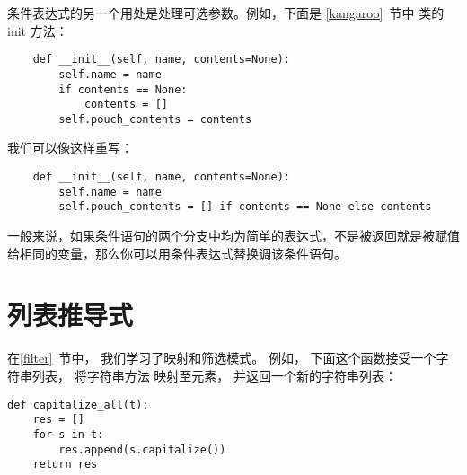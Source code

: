 条件表达式的另一个用处是处理可选参数。例如，下面是 \ref{kangaroo}~节中  类的 init 方法：


\begin{lstlisting}
    def __init__(self, name, contents=None):
        self.name = name
        if contents == None:
            contents = []
        self.pouch_contents = contents
\end{lstlisting}


我们可以像这样重写：

\begin{lstlisting}
    def __init__(self, name, contents=None):
        self.name = name
        self.pouch_contents = [] if contents == None else contents
\end{lstlisting}


一般来说，如果条件语句的两个分支中均为简单的表达式，不是被返回就是被赋值给相同的变量，那么你可以用条件表达式替换调该条件语句。



\section{列表推导式}


在\ref{filter}~节中， 我们学习了映射和筛选模式。  例如， 下面这个函数接受一个字符串列表， 将字符串方法  映射至元素， 并返回一个新的字符串列表：

\begin{lstlisting}
def capitalize_all(t):
    res = []
    for s in t:
        res.append(s.capitalize())
    return res
\end{lstlisting}

